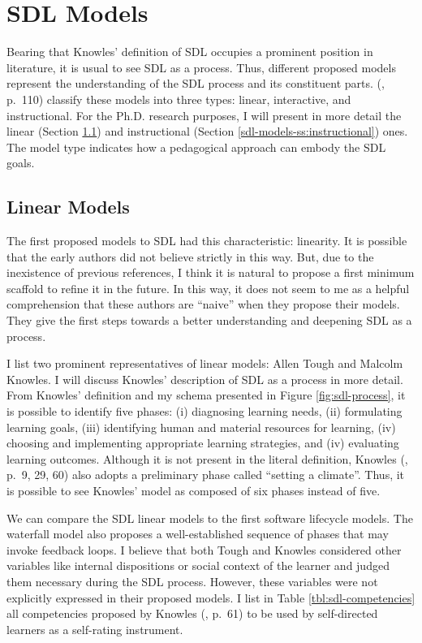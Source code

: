 \section{SDL Models}
\label{sdl-sec:models}

Bearing that Knowles’ definition of \gls{SDL} occupies a prominent position in literature, it is usual to see \gls{SDL} as a process. Thus, different proposed models represent the understanding of the \gls{SDL} process and its constituent parts.  (\citeyear{merriam:2007}, p.~110) classify these models into three types: linear, interactive, and instructional. For the \gls{Ph.D.} research purposes, I will present in more detail the linear (Section \ref{sdl-models-ss:linear}) and instructional (Section \ref{sdl-models-ss:instructional}) ones. The model type indicates how a pedagogical approach can embody the \gls{SDL} goals.

\subsection{Linear Models}
\label{sdl-models-ss:linear}

The first proposed models to \gls{SDL} had this characteristic: linearity. It is possible that the early authors did not believe strictly in this way. But, due to the inexistence of previous references, I think it is natural to propose a first minimum scaffold to refine it in the future. In this way, it does not seem to me as a helpful comprehension that these authors are “naive” when they propose their models. They give the first steps towards a better understanding and deepening \gls{SDL} as a process.

I list two prominent representatives of linear models: Allen Tough and Malcolm Knowles. I will discuss Knowles’ description of \gls{SDL} as a process in more detail. From Knowles' definition and my schema presented in Figure \ref{fig:sdl-process}, it is possible to identify five phases: (i) diagnosing learning needs, (ii) formulating learning goals, (iii) identifying human and material resources for learning, (iv) choosing and implementing appropriate learning strategies, and (iv) evaluating learning outcomes. Although it is not present in the literal definition, Knowles (\citeyear{knowles:1975}, p.~9, 29, 60) also adopts a preliminary phase called “setting a climate”. Thus, it is possible to see Knowles' model as composed of six phases instead of five.

We can compare the \gls{SDL} linear models to the first software lifecycle models. The waterfall model \cite[p.~8]{ruparelia:2010} also proposes a well-established sequence of phases that may invoke feedback loops. I believe that both Tough and Knowles considered other variables like internal dispositions or social context of the learner and judged them necessary during the \gls{SDL} process. However, these variables were not explicitly expressed in their proposed models. I list in Table \ref{tbl:sdl-competencies} all competencies proposed by Knowles (\citeyear{knowles:1975}, p.~61) to be used by self-directed learners as a self-rating instrument.

